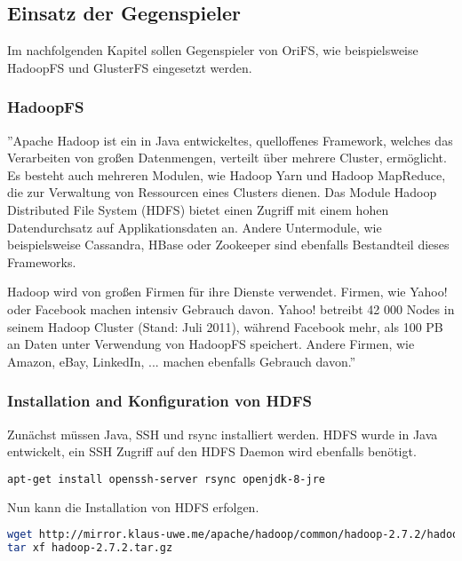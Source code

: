 \subsection{Einsatz der Gegenspieler}
\label{subsec:Einsatz der Gegenspieler}
Im nachfolgenden Kapitel sollen Gegenspieler von OriFS, wie beispielsweise HadoopFS und GlusterFS eingesetzt werden.

\subsubsection{HadoopFS \cite{hdfs_install, hdfs_ug, hdfs_cmd}}
\label{subsubsec:HadoopFS}
''Apache Hadoop ist ein in Java entwickeltes, quelloffenes Framework, welches das Verarbeiten von großen Datenmengen, verteilt über mehrere Cluster, ermöglicht. Es besteht auch mehreren Modulen, wie Hadoop Yarn und Hadoop MapReduce, die zur Verwaltung von Ressourcen eines Clusters dienen. Das Module Hadoop Distributed File System (HDFS) bietet einen Zugriff mit einem hohen Datendurchsatz auf Applikationsdaten an. Andere Untermodule, wie beispielsweise Cassandra, HBase oder Zookeeper sind ebenfalls Bestandteil dieses Frameworks.

Hadoop wird von großen Firmen für ihre Dienste verwendet. Firmen, wie Yahoo! oder Facebook machen intensiv Gebrauch davon. Yahoo! betreibt 42 000 Nodes in seinem Hadoop Cluster (Stand: Juli 2011), während Facebook mehr, als 100 PB an Daten unter Verwendung von HadoopFS speichert. Andere Firmen, wie Amazon, eBay, LinkedIn, ... machen ebenfalls Gebrauch davon.'' \cite{comparison}

\subsubsection{Installation and Konfiguration von HDFS}
\label{subsubsec:Installation and Konfiguration von HDFS}
Zunächst müssen Java, SSH und rsync installiert werden. HDFS wurde in Java entwickelt, ein SSH Zugriff auf den HDFS Daemon wird ebenfalls benötigt.

\begin{lstlisting}[frame=single, language=bash, caption=Installieren der benötigten Softwarepakete]
apt-get install openssh-server rsync openjdk-8-jre
\end{lstlisting}

Nun kann die Installation von HDFS erfolgen.
\begin{lstlisting}[frame=single, language=bash, caption=Herunterladen und Entpacken von HDFS]
wget http://mirror.klaus-uwe.me/apache/hadoop/common/hadoop-2.7.2/hadoop-2.7.2.tar.gz
tar xf hadoop-2.7.2.tar.gz
\end{lstlisting}

